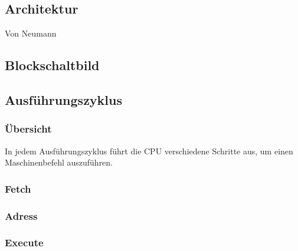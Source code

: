 \documentclass{report}
\begin{document}
\subsection{Architektur}
Von Neumann

\subsection{Blockschaltbild}

\subsection{Ausführungszyklus}
\subsubsection{Übersicht}
In jedem Ausführungszyklus führt die CPU verschiedene Schritte aus, um einen Maschinenbefehl auszuführen. 
\subsubsection{Fetch}
\subsubsection{Adress}
\subsubsection{Execute}
\end{document}
